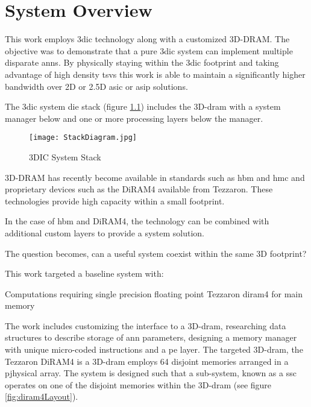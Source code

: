 



\chapter{System Overview}
\label{chap-five}
\label{sec:System Overview}
This work employs \ac{3dic} technology along with a customized 3D-DRAM. The objective was to demonstrate that a pure \ac{3dic} system can implement multiple disparate \acp{ann}. By physically staying within the \ac{3dic} footprint and taking advantage of high
density \acp{tsv} this work is able to maintain a significantly higher bandwidth over 2D or 2.5D \ac{asic} or \ac{asip} solutions.

The \ac{3dic} system die stack (figure \ref{fig:3DICStack}) includes the 3D-\ac{dram} with a system manager below and one or more processing layers below the manager.
\begin{figure}[!t]
\centering
\captionsetup{justification=centering}
\captionsetup{width=.9\linewidth}
\centerline{
\mbox{\texttt{[image: StackDiagram.jpg]}}
}
\caption{3DIC System Stack}
\label{fig:3DICStack}
\end{figure}

3D-DRAM has recently become available in standards such as \ac{hbm} and \ac{hmc} and proprietary devices such as the DiRAM4 available from Tezzaron. 
These technologies provide high capacity within a small footprint.

In the case of \ac{hbm} and DiRAM4, the technology can be combined with additional custom layers to provide a system solution.

The question becomes, can a useful system coexist within the same 3D footprint?

This work targeted a baseline system with:
\begin{outline}
  \1 Computations requiring single precision floating point
  \1 Tezzaron \acf{diram4} \cite{tezzaron:diram4} for main memory
\end{outline}
The work includes customizing the interface to a 3D-\ac{dram}, researching data structures to describe storage of \ac{ann} parameters, designing a memory manager with unique micro-coded instructions and a \ac{pe} layer.  
The targeted 3D-\ac{dram}, the Tezzaron DiRAM4 is a 3D-\ac{dram} employs 64 disjoint memories arranged in a pjhysical array.
The system is designed such that a sub-system, known as a \ac{ssc} operates on one of the disjoint memories within the 3D-\ac{dram} (see figure \ref{fig:diram4Layout}).

